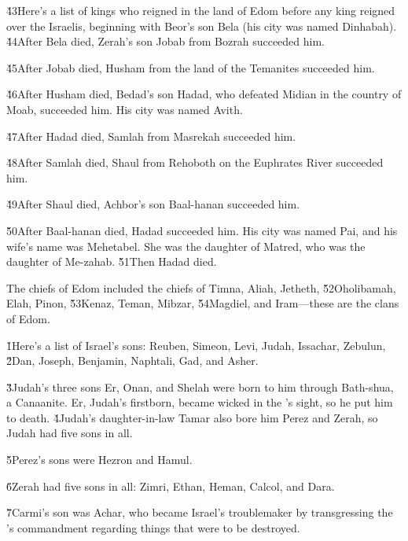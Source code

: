 \v{43}Here's a list of kings who reigned in the land of Edom before any king reigned over the Israelis, beginning with Beor's son Bela (his city was named Dinhabah). \v{44}After Bela died, Zerah's son Jobab from Bozrah succeeded him.

\v{45}After Jobab died, Husham from the land of the Temanites succeeded him.

\v{46}After Husham died, Bedad's son Hadad, who defeated Midian in the country of Moab, succeeded him. His city was named Avith.

\v{47}After Hadad died, Samlah from Masrekah succeeded him.

\v{48}After Samlah died, Shaul from Rehoboth on the Euphrates River succeeded him.

\v{49}After Shaul died, Achbor's son Baal-hanan succeeded him.

\v{50}After Baal-hanan died, Hadad succeeded him. His city was named Pai, and his wife's name was Mehetabel. She was the daughter of Matred, who was the daughter of Me-zahab. \v{51}Then Hadad died.

The chiefs of Edom included the chiefs of Timna, Aliah, Jetheth, \v{52}Oholibamah, Elah, Pinon, \v{53}Kenaz, Teman, Mibzar, \v{54}Magdiel, and Iram---these are the clans of Edom.

\v{1}Here's a list of Israel's sons: Reuben, Simeon, Levi, Judah, Issachar, Zebulun, \v{2}Dan, Joseph, Benjamin, Naphtali, Gad, and Asher.

\v{3}Judah's three sons Er, Onan, and Shelah were born to him through Bath-shua, a Canaanite. Er, Judah's firstborn, became wicked in the 's sight, so he put him to death. \v{4}Judah's daughter-in-law Tamar also bore him Perez and Zerah, so Judah had five sons in all.

\v{5}Perez's sons were Hezron and Hamul.

\v{6}Zerah had five sons in all: Zimri, Ethan, Heman, Calcol, and Dara.

\v{7}Carmi's son was Achar, who became Israel's troublemaker by transgressing the 's commandment regarding things that were to be destroyed.


